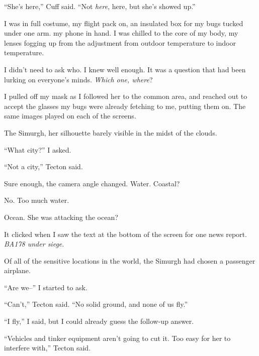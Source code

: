 ``She's here,'' Cuff said.  ``Not \emph{here}, here, but she's showed up.''



I was in full costume, my flight pack on, an insulated box for my bugs tucked under one arm. my phone in hand.  I was chilled to the core of my body, my lenses fogging up from the adjustment from outdoor temperature to indoor temperature.



I didn't need to ask who.  I knew well enough.  It was a question that had been lurking on everyone's minds.  \emph{Which one, where}?



I pulled off my mask as I followed her to the common area, and reached out to accept the glasses my bugs were already fetching to me, putting them on.  The same images played on each of the screens.



The Simurgh, her silhouette barely visible in the midst of the clouds.



``What city?'' I asked.



``Not a city,'' Tecton said.



Sure enough, the camera angle changed.  Water.  Coastal?



No.  Too much water.



Ocean.  She was attacking the ocean?



It clicked when I saw the text at the bottom of the screen for one news report.  \emph{BA178 under siege}.



Of all of the sensitive locations in the world, the Simurgh had chosen a passenger airplane.



``Are we--'' I started to ask.



``Can't,'' Tecton said.  ``No solid ground, and none of us fly.''



``I fly,'' I said, but I could already guess the follow-up answer.



``Vehicles and tinker equipment aren't going to cut it.  Too easy for her to interfere with,'' Tecton said.



